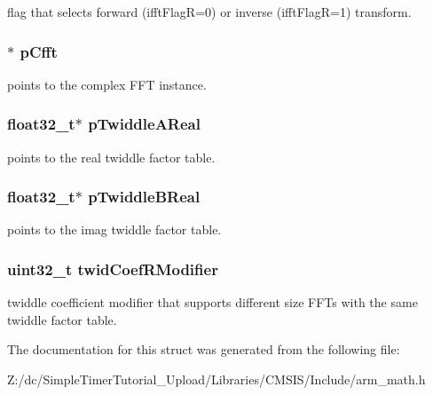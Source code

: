 flag that selects forward (ifft\-Flag\-R=0) or inverse (ifft\-Flag\-R=1) transform. \hypertarget{structarm__rfft__instance__f32_ab7bd4d374a1780dea50efd3e7ac220be}{
\subsubsection[{p\-Cfft}]{$\ast$ p\-Cfft}}\label{structarm__rfft__instance__f32_ab7bd4d374a1780dea50efd3e7ac220be}
points to the complex F\-F\-T instance. \hypertarget{structarm__rfft__instance__f32_a1fb731395d060f9999c91c242b3e8a61}{
\subsubsection[{p\-Twiddle\-A\-Real}]{\setlength{\rightskip}{0pt plus 5cm}float32\-\_\-t$\ast$ p\-Twiddle\-A\-Real}}\label{structarm__rfft__instance__f32_a1fb731395d060f9999c91c242b3e8a61}
points to the real twiddle factor table. \hypertarget{structarm__rfft__instance__f32_ab13a458744ac79bb23784351e8002382}{
\subsubsection[{p\-Twiddle\-B\-Real}]{\setlength{\rightskip}{0pt plus 5cm}float32\-\_\-t$\ast$ p\-Twiddle\-B\-Real}}\label{structarm__rfft__instance__f32_ab13a458744ac79bb23784351e8002382}
points to the imag twiddle factor table. \hypertarget{structarm__rfft__instance__f32_a5b06f7f76c018db993fe6acc5708c589}{
\subsubsection[{twid\-Coef\-R\-Modifier}]{\setlength{\rightskip}{0pt plus 5cm}uint32\-\_\-t twid\-Coef\-R\-Modifier}}\label{structarm__rfft__instance__f32_a5b06f7f76c018db993fe6acc5708c589}
twiddle coefficient modifier that supports different size F\-F\-Ts with the same twiddle factor table. 

The documentation for this struct was generated from the following file\-:\begin{DoxyCompactItemize}
\item 
Z\-:/dc/\-Simple\-Timer\-Tutorial\-\_\-\-Upload/\-Libraries/\-C\-M\-S\-I\-S/\-Include/arm\-\_\-math.\-h\end{DoxyCompactItemize}

